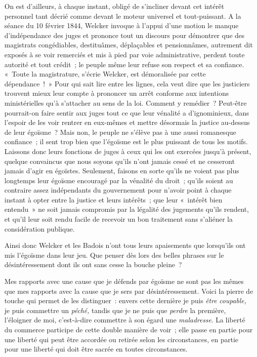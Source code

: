 \documentclass[french,twoside]{book} %
\begin{document}
On est d’ailleurs, à chaque instant, obligé de s’incliner devant cet intérêt personnel tant décrié  comme devant le moteur universel et tout-puissant. A la séance du 10 février 1844, Welcker invoque à l’appui d’une motion le manque d’indépendance des juges et prononce tout un discours pour démontrer que des magistrats congédiables, destituâmes, déplaçables et pensionnâmes, autrement dit exposés à se voir remerciés et mis à pied par voie administrative, perdent toute autorité et tout crédit ; le peuple même leur refuse son respect et sa confiance. « Toute la magistrature, s’écrie Welcker, est démoralisée par cette dépendance ! » Pour qui sait lire entre les lignes, cela veut dire que les justiciers trouvent mieux leur compte à prononcer un arrêt conforme aux intentions ministérielles qu’à s’attacher au sens de la loi. Comment y remédier ? Peut-être pourrait-on faire sentir aux juges tout ce que leur vénalité a d’ignominieux, dans l’espoir de les voir rentrer en eux-mêmes et mettre désormais la justice au-dessus de leur égoïsme ? Mais non, le peuple ne s’élève pas à une aussi romanesque confiance ; il sent trop bien que l’égoïsme est le plus puissant de tous les motifs. Laissons donc leurs fonctions de juges à ceux qui les ont exercées jusqu’à présent, quelque convaincus que nous soyons qu’ils n’ont jamais cessé et ne cesseront jamais d’agir en égoïstes. Seulement, faisons en sorte qu’ils ne voient pas plus longtemps leur égoïsme encouragé par la vénalité du droit ; qu’ils soient au contraire assez indépendants du gouvernement pour n’avoir point à chaque instant à opter entre la justice et leurs intérêts ; que leur « intérêt bien entendu » ne soit jamais compromis par la légalité des jugements qu’ils rendent, et qu’il leur soit rendu facile de recevoir un bon traitement sans s’aliéner la considération publique.\par
Ainsi donc Welcker et les Badois n’ont tous leurs apaisements que lorsqu’ils ont mis l’égoïsme dans leur jeu. Que penser dès lors des belles phrases sur le désintéressement dont ils ont sans cesse la bouche pleine ?\par
 Mes rapports avec une cause que je défends par égoïsme ne sont pas les mêmes que mes rapports avec la cause que je sers par désintéressement. Voici la pierre de touche qui permet de les distinguer : envers cette dernière je puis \emph{être coupable,} je puis commettre un \emph{péché,} tandis que je ne puis que \emph{perdre} la première, l’éloigner de moi, c’est-à-dire commettre à son égard une \emph{maladresse}. La liberté du commerce participe de cette double manière de voir ; elle passe en partie pour une liberté qui peut être accordée ou retirée selon les circonstances, en partie pour une liberté qui doit être sacrée en toutes circonstances.\par
\end{document}
